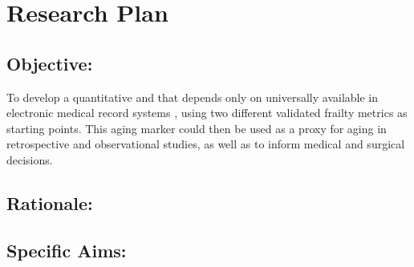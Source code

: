 \section{Research Plan }\label{research-plan}


\subsection{Objective:}\label{objective}
  
To develop a quantitative and that depends only on universally available in electronic medical record systems ,
using two different validated frailty metrics as starting points. This
aging marker could then be used as a proxy for aging in retrospective
and observational studies, as well as to inform medical and surgical
decisions.


\subsection{Rationale:}\label{rationale}

\subsection{Specific Aims:}\label{specific-aims}
